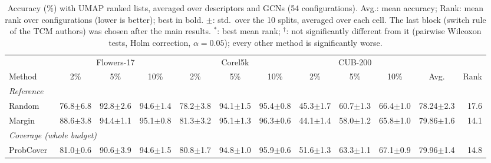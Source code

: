 \begin{table}[t]
\centering
\caption{Accuracy (\%) with UMAP ranked lists, averaged over descriptors and GCNs (54 configurations). Avg.: mean accuracy; Rank: mean rank over configurations (lower is better); best in bold. $\pm$: std.\ over the 10 splits, averaged over each cell. The last block (switch rule of the TCM authors) was chosen after the main results. $^{*}$: best mean rank; $^{\dagger}$: not significantly different from it (pairwise Wilcoxon tests, Holm correction, $\alpha=0.05$); every other method is significantly worse.}
\label{tab:sota-umap-std}
\footnotesize
\setlength{\tabcolsep}{3.5pt}
\begin{adjustbox}{max width=\textwidth}
\begin{tabular}{lrrrrrrrrrrr}
\toprule
& \multicolumn{3}{c}{Flowers-17} & \multicolumn{3}{c}{Corel5k} & \multicolumn{3}{c}{CUB-200} & & \\
\cmidrule(lr){2-4}\cmidrule(lr){5-7}\cmidrule(lr){8-10}
Method & \multicolumn{1}{c}{2\%} & \multicolumn{1}{c}{5\%} & \multicolumn{1}{c}{10\%} & \multicolumn{1}{c}{2\%} & \multicolumn{1}{c}{5\%} & \multicolumn{1}{c}{10\%} & \multicolumn{1}{c}{2\%} & \multicolumn{1}{c}{5\%} & \multicolumn{1}{c}{10\%} & \multicolumn{1}{c}{Avg.} & \multicolumn{1}{c}{Rank} \\
\midrule
\multicolumn{12}{l}{\textit{Reference}} \\
\quad Random & 76.8{\scriptsize$\pm$6.8} & 92.8{\scriptsize$\pm$2.6} & 94.6{\scriptsize$\pm$1.4} & 78.2{\scriptsize$\pm$3.8} & 94.1{\scriptsize$\pm$1.5} & 95.4{\scriptsize$\pm$0.8} & 45.3{\scriptsize$\pm$1.7} & 60.7{\scriptsize$\pm$1.3} & 66.4{\scriptsize$\pm$1.0} & 78.24{\scriptsize$\pm$2.3} & 17.6 \\
\quad Margin~\cite{scheffer2001active} & 88.6{\scriptsize$\pm$3.8} & 94.4{\scriptsize$\pm$1.1} & 95.1{\scriptsize$\pm$0.8} & 81.3{\scriptsize$\pm$3.2} & 95.1{\scriptsize$\pm$1.3} & 96.3{\scriptsize$\pm$0.6} & 44.1{\scriptsize$\pm$1.4} & 58.0{\scriptsize$\pm$1.2} & 65.8{\scriptsize$\pm$1.0} & 79.86{\scriptsize$\pm$1.6} & 14.1 \\
\multicolumn{12}{l}{\textit{Coverage (whole budget)}} \\
\quad ProbCover~\cite{yehuda2022active} & 81.0{\scriptsize$\pm$0.6} & 90.6{\scriptsize$\pm$3.9} & 94.6{\scriptsize$\pm$1.5} & 80.8{\scriptsize$\pm$1.7} & 94.8{\scriptsize$\pm$1.0} & 95.9{\scriptsize$\pm$0.6} & 51.6{\scriptsize$\pm$1.3} & 63.3{\scriptsize$\pm$1.1} & 67.1{\scriptsize$\pm$0.9} & 79.96{\scriptsize$\pm$1.4} & 14.8 \\

\end{tabular}
\end{adjustbox}
\end{table}
